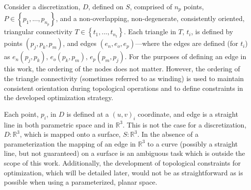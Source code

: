 Consider a discretization, $D$, defined on $S$, comprised of $n_p$
points, $P \in \left\{p_1,...,p_{n_p} \right\}$, and a non-overlapping,
non-degenerate, consistently oriented, triangular connectivity $T \in
\left\{t_1,...,t_{n_t} \right\}$. Each triangle in $T$, $t_i$, is
defined by points $\left(p_j, p_k, p_m\right)$, and edges $\left(e_n,
e_o, e_p\right)$---where the edges are defined (for $t_i$) as $e_n
\left(p_j, p_k\right)$, $e_o \left(p_k, p_m\right)$, $e_p \left(p_m,
p_j\right)$. For the purposes of defining an edge in this work, the
ordering of the nodes does not matter. However, the ordering of the
triangle connectivity (sometimes referred to as winding) is used to
maintain consistent orientation during topological operations and to
define constraints in the developed optimization strategy.

Each point, $p_i$, in $D$ is defined at a $\left(u,v\right)_i$
coordinate, and edge is a straight line in both parametric space and in
${\mathbb R}^3$. This is not the case for a discretization, $D:{\mathbb
R}^3$, which is mapped onto a surface, $S:{\mathbb R}^3$. In the absence
of a parameterization the mapping of an edge in ${\mathbb R}^3$ to a
curve (possibly a straight line, but not guaranteed) on a surface is an
ambiguous task which is outside the scope of this work. Additionally,
the development of topological constraints for optimization, which will
be detailed later, would not be as straightforward as is possible when
using a parameterized, planar space.
